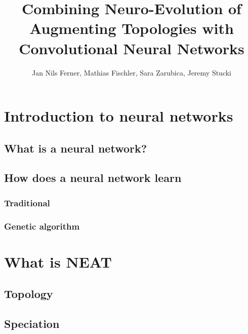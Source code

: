 \documentclass[11pt]{article}
\title{Combining Neuro-Evolution of Augmenting Topologies with Convolutional Neural Networks}
\author{Jan Nils Ferner, Mathias Fischler, Sara Zarubica, Jeremy Stucki}
\begin{document}
\maketitle
\newpage

\begin{abstract}

	\newpage

\end{abstract}

	\tableofcontents
	\newpage

	\section{Introduction to neural networks}
		\subsection{What is a neural network?}
			
		\subsection{How does a neural network learn}
			\subsubsection{Traditional}
				
			\subsubsection{Genetic algorithm}
				
	\newpage

	\section{What is NEAT}
		
		\subsection{Topology}
			
		\subsection{Speciation}
			
	\newpage
\end{document}
